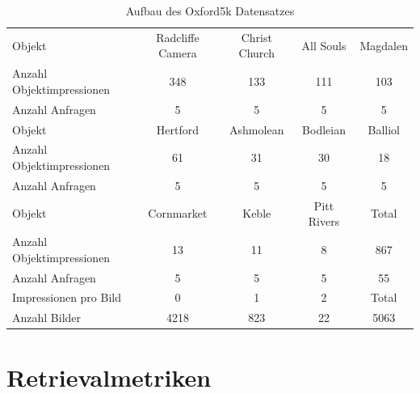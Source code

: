 \begin{table}[h]
\centering
\begin{tabular}{l|c|c|c|c}
\rowcolor[HTML]{C0C0C0} 
Objekt                 & Radcliffe Camera & Christ Church & All Souls   & Magdalen \\
Anzahl Objektimpressionen & 348              & 133           & 111         & 103      \\
Anzahl Anfragen           & 5                & 5             & 5           & 5        \\ \hline
\rowcolor[HTML]{C0C0C0} 
Objekt                & Hertford         & Ashmolean     & Bodleian    & Balliol  \\
Anzahl Objektimpressionen & 61               & 31            & 30          & 18       \\
Anzahl Anfragen           & 5                & 5             & 5           & 5        \\ \hline
\rowcolor[HTML]{C0C0C0} 
Objekt                 & Cornmarket       & Keble         & Pitt Rivers & Total    \\
Anzahl Objektimpressionen & 13               & 11            & 8           & 867      \\
Anzahl Anfragen           & 5                & 5             & 5           & 55       \\ \hline
\rowcolor[HTML]{C0C0C0} 
Impressionen pro Bild     & 0                & 1             & 2           & Total    \\
Anzahl Bilder             & 4218             & 823           & 22          & 5063    
\end{tabular}%
\caption{Aufbau des Oxford5k Datensatzes}
\label{oxford5k_data}
\end{table}

\section{Retrievalmetriken}

